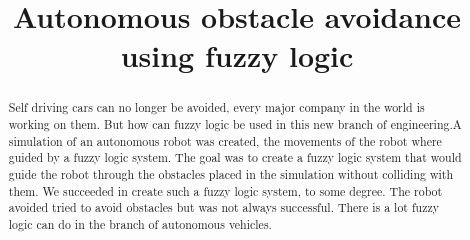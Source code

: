 \documentclass[conference]{IEEEtran}
\begin{document}
%
\title{Autonomous obstacle avoidance using fuzzy logic}


\author{
\and
{}
\and 
{}
}

\date{}


\maketitle




\begin{abstract}
  Self driving cars can no longer be avoided, every major company in the world is working on them. But how can fuzzy logic be used in this new branch of engineering.A simulation of an autonomous robot was created, the movements of the robot where guided by a fuzzy logic system. The goal was to create a fuzzy logic system that would guide the robot through the obstacles placed in the simulation without colliding with them. We succeeded in create such a fuzzy logic system, to some degree. The robot avoided tried to avoid obstacles but was not always successful. There is a lot fuzzy logic can do in the branch of autonomous vehicles.
\end{abstract}

%
\end{document}
